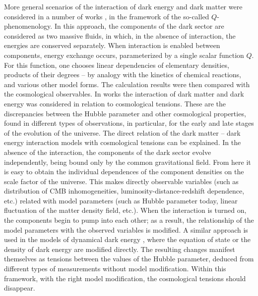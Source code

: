 \documentclass{article}
\begin{document}
More general scenarios of the interaction of dark energy and dark matter were considered in a number of works \cite {1809.05678,1812.06854,1911.04520,1903.02370}, in the framework of the so-called $Q$-phenomenology. In this approach, the components of the dark sector are considered as two massive fluids, in which, in the absence of interaction, the energies are conserved separately. When interaction is enabled between components, energy exchange occurs, parameterized by a single scalar function $ Q $. For this function, one chooses linear dependencies of elementary densities, products of their degrees -- by analogy with the kinetics of chemical reactions, and various other model forms. The calculation results were then compared with the cosmological observables. In works \cite{2010.10823,2002.06127,1804.08558,1812.03540,1907.12551,2001.05103,1908.04281,1910.09853,2009.12620,1902.10636,1908.09843,2002.03408,1908.03324,1907.01496} the interaction of dark matter and dark energy was considered in relation to cosmological tensions. These are the discrepancies between the Hubble parameter and other cosmological properties, found in different types of observations, in particular, for the early and late stages of the evolution of the universe. The direct relation of the dark matter -- dark energy interaction models with cosmological tensions can be explained. In the absence of the interaction, the components of the dark sector evolve independently, being bound only by the common gravitational field. From here it is easy to obtain the individual dependences of the component densities on the scale factor of the universe. This makes directly observable variables (such as distribution of CMB inhomogeneities, luminosity-distance-redshift dependence, etc.) related with model parameters (such as Hubble parameter today, linear fluctuation of the matter density field, etc.). When the interaction is turned on, the components begin to pump into each other; as a result, the relationship of the model parameters with the observed variables is modified. A similar approach is used in the models of dynamical dark energy \cite {1906.09189,1701.08165,1807.03772}, where the equation of state or the density of dark energy are modified directly. The resulting changes manifest themselves as tensions between the values of the Hubble parameter, deduced from different types of measurements without model modification. Within this framework, with the right model modification, the cosmological tensions should disappear. 
\end{document}
